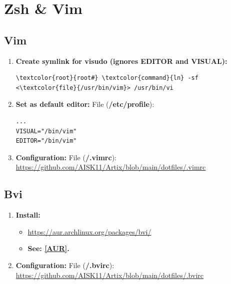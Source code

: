 \documentclass[10pt, a4paper, onecolumn, oneside, titlepage, openany]{book}
\begin{document}
\chapter{Zsh \& Vim}
\section{Vim}
\begin{enumerate}
    \item \textbf{Create symlink for visudo (ignores EDITOR and VISUAL):}
\begin{Verbatim}[commandchars=\\\{\}]
\textcolor{root}{root#} \textcolor{command}{ln} -sf <\textcolor{file}{/usr/bin/vim}> /usr/bin/vi
\end{Verbatim}
    \item \textbf{Set as default editor:}
\newline File (\textbf{\textcolor{file}{/etc/profile}}):
\begin{Verbatim}[commandchars=\\\{\}]
...
VISUAL="/bin/vim"
EDITOR="/bin/vim"
\end{Verbatim}
    \item \textbf{Configuration:}
\newline File (\textbf{\textcolor{file}{\texttildelow/.vimrc}}):
\newline \url{https://github.com/AISK11/Artix/blob/main/dotfiles/.vimrc}
\end{enumerate}

\section{Bvi}
\begin{enumerate}
    \item \textbf{Install:}
    \begin{itemize}
        \item \url{https://aur.archlinux.org/packages/bvi/}
        \item \textbf{See: \underline{\ref{AUR}}.}
    \end{itemize}
    \item \textbf{Configuration:}
\newline File (\textbf{\textcolor{file}{\texttildelow/.bvirc}}):
\newline \url{https://github.com/AISK11/Artix/blob/main/dotfiles/.bvirc}
\end{enumerate}
\end{document}
